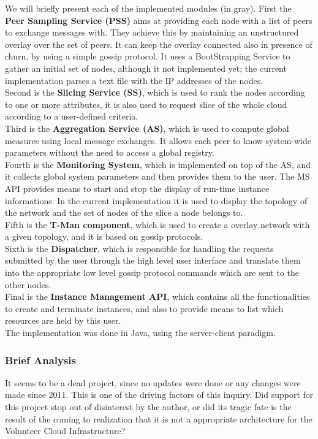 \documentclass[11pt]{amsart}
\begin{document}
	We will briefly present each of the implemented modules (in gray).
	First the \textbf{Peer Sampling Service (PSS)} aims at providing each node with a list of peers to exchange 
	messages with. They achieve this by maintaining an unstructured overlay over the set of peers. It can 
	keep the overlay connected also in presence of churn, by using a simple gossip protocol. It uses a 
	BootStrapping Service to gather an initial set of nodes, although it not implemented yet; the current 
	implementation parses a text file with the IP addresses of the nodes.
	\\
	Second is the \textbf{Slicing Service (SS)}, which is used to rank the nodes according to one or more attributes, 
	it is also used to request slice of the whole cloud according to a user-defined criteria.
	\\
	Third is the \textbf{Aggregation Service (AS)}, which is used to compute global measures using local message 
	exchanges. It allows each peer to know system-wide parameters without the need to access a global registry.
	\\
	Fourth is the \textbf{Monitoring System}, which is implemented on top of the AS, and it collects global system 
	parameters and then provides them to the user. The MS API provides means to start and stop the display 
	of run-time instance informations. In the current implementation it is used to display the topology of 
	the network and the set of nodes of the slice a node belongs to.
	\\
	Fifth is the \textbf{T-Man component}, which is used to create a overlay network with a given topology, and it 
	is based on gossip protocols.
	\\
	Sixth is the \textbf{Dispatcher}, which is responsible for handling the requests submitted by the user through 
	the high level user interface and translate them into the appropriate low level gossip protocol 
	commands which are sent to the other nodes.
	\\
	Final is the \textbf{Instance Management API}, which contains all the functionalities to create and terminate 
	instances, and also to provide means to list which resources are held by this user.
	\\
	The implementation was done in Java, using the server-client paradigm.
	
	\subsubsection{Brief Analysis}
	It seems to be a dead project, since no updates were done or any changes were made since 2011. This 
	is one of the driving factors of this inquiry. Did support for this project stop out of disinterest 
	by the author, or did its tragic fate is the result of the coming to realization that it is not a 
	appropriate architecture for the Volunteer Cloud Infrastructure?
	
\end{document}
